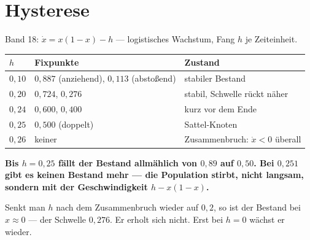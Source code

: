 \section{Hysterese}

\begin{merksatz}
Band 18: $\dot x = x(1-x) - h$ --- logistisches Wachstum, Fang $h$ je Zeiteinheit.

\begin{center}
{\small
\renewcommand{\arraystretch}{1.48}
\begin{tabular}{@{}P{1.4cm}P{3.0cm}P{4.0cm}@{}}
\toprule
$h$ & \textbf{Fixpunkte} & \textbf{Zustand}\\
\midrule
$0{,}10$ & $0{,}887$ (anziehend), $0{,}113$ (abstoßend) & stabiler Bestand\\
$0{,}20$ & $0{,}724$, $0{,}276$ & stabil, Schwelle rückt näher\\
$0{,}24$ & $0{,}600$, $0{,}400$ & kurz vor dem Ende\\
$0{,}25$ & $0{,}500$ (doppelt) & Sattel-Knoten\\
$0{,}26$ & keiner & Zusammenbruch: $\dot x < 0$ überall\\
\bottomrule
\end{tabular}}
\end{center}

\begin{center}
\begin{minipage}{0.9\textwidth}
\textbf{Bis $h = 0{,}25$ fällt der Bestand allmählich von $0{,}89$ auf $0{,}50$. Bei $0{,}251$ gibt es keinen Bestand mehr --- die Population stirbt, nicht langsam, sondern mit der Geschwindigkeit $h - x(1-x)$.}
\end{minipage}
\end{center}

Senkt man $h$ nach dem Zusammenbruch wieder auf $0{,}2$, so ist der Bestand bei $x \approx 0$ ---  der Schwelle $0{,}276$. Er erholt sich nicht. Erst bei $h = 0$ wächst er wieder.

\begin{center}
\begin{minipage}{0.88\textwidth}
\end{minipage}
\end{center}
\end{merksatz}

